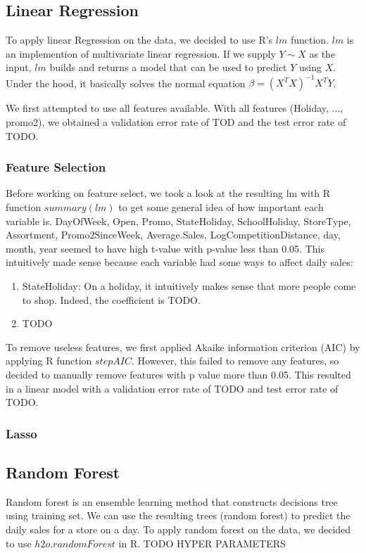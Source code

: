\documentclass[letterpaper,twocolumn,10pt]{article}
\begin{document}
\subsection{Linear Regression}
To apply linear Regression on the data, we decided to use R's $lm$ function. $lm$ is an implemention of multivariate linear regression. If we supply $Y \sim X$ as the input, $lm$ builds and returns a model that can be used to predict $Y$ using $X$. Under the hood, it basically solves the normal equation $\beta = (X^T X)^{-1} X^T Y$.

We first attempted to use all features available. With all features (Holiday, ..., promo2), we obtained a validation error rate of TOD and the test error rate of TODO.

\subsubsection{Feature Selection}
Before working on feature select, we took a look at the resulting lm with R function $summary(lm)$ to get some general idea of how important each variable is. DayOfWeek, Open, Promo, StateHoliday, SchoolHoliday, StoreType, Assortment, Promo2SinceWeek, Average.Sales, LogCompetitionDistance, day, month, year seemed to have high t-value with p-value less than 0.05. This intuitively made sense because each variable had some ways to affect daily sales:
\begin{enumerate}
\item StateHoliday: On a holiday, it intuitively makes sense that more people come to shop. Indeed, the coefficient is TODO.
\item TODO
\end{enumerate}

To remove useless features, we first applied Akaike information criterion (AIC) by applying R function $stepAIC$. However, this failed to remove any features, so decided to manually remove features with p value more than 0.05. This resulted in a linear model with a validation error rate of TODO and test error rate of TODO.

\subsubsection{Lasso}


\subsection{Random Forest}
Random forest is an ensemble learning method that constructs decisions tree using training set. We can use the resulting trees (random forest) to predict the daily sales for a store on a day. To apply random forest on the data, we decided to use $h2o.randomForest$ in R. 
TODO HYPER PARAMETERS
\end{document}
